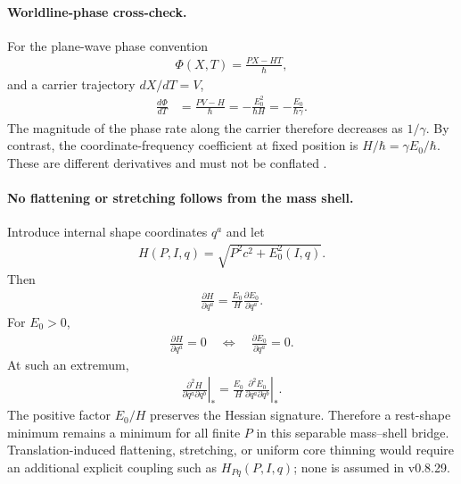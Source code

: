 \paragraph{Worldline-phase cross-check.}
For the plane-wave phase convention
\begin{align}
    \Phi(X,T)
    =
    \frac{PX-HT}{\hbar},
\end{align}
and a carrier trajectory \(dX/dT=V\),
\begin{align}
    \frac{d\Phi}{dT}
    &=
    \frac{PV-H}{\hbar}
    =
    -\frac{E_0^2}{\hbar H}
    =
    -\frac{E_0}{\hbar\gamma}.
    \label{eq:rt_action_phase_worldline_phase}
\end{align}
The magnitude of the phase rate along the carrier therefore decreases as
\(1/\gamma\).  By contrast, the coordinate-frequency coefficient at fixed
position is \(H/\hbar=\gamma E_0/\hbar\).  These are different derivatives and
must not be conflated \cite{DeBroglie1925}.

\paragraph{No flattening or stretching follows from the mass shell.}
Introduce internal shape coordinates \(q^a\) and let
\begin{align}
    H(P,I,q)
    =
    \sqrt{P^2c^2+E_0^2(I,q)}.
    \label{eq:rt_action_phase_shape_hamiltonian}
\end{align}
Then
\begin{align}
    \frac{\partial H}{\partial q^a}
    =
    \frac{E_0}{H}
    \frac{\partial E_0}{\partial q^a}.
    \label{eq:rt_action_phase_shape_gradient}
\end{align}
For \(E_0>0\),
\begin{align}
    \frac{\partial H}{\partial q^a}=0
    \quad\Longleftrightarrow\quad
    \frac{\partial E_0}{\partial q^a}=0.
    \label{eq:rt_action_phase_same_shape_extrema}
\end{align}
At such an extremum,
\begin{align}
    \left.\frac{\partial^2H}{\partial q^a\partial q^b}\right|_*
    =
    \frac{E_0}{H}
    \left.\frac{\partial^2E_0}{\partial q^a\partial q^b}\right|_*.
    \label{eq:rt_action_phase_shape_hessian}
\end{align}
The positive factor \(E_0/H\) preserves the Hessian signature.  Therefore a
rest-shape minimum remains a minimum for all finite \(P\) in this separable
mass--shell bridge.  Translation-induced flattening, stretching, or uniform
core thinning would require an additional explicit coupling such as
\(H_{Pq}(P,I,q)\); none is assumed in v0.8.29.

